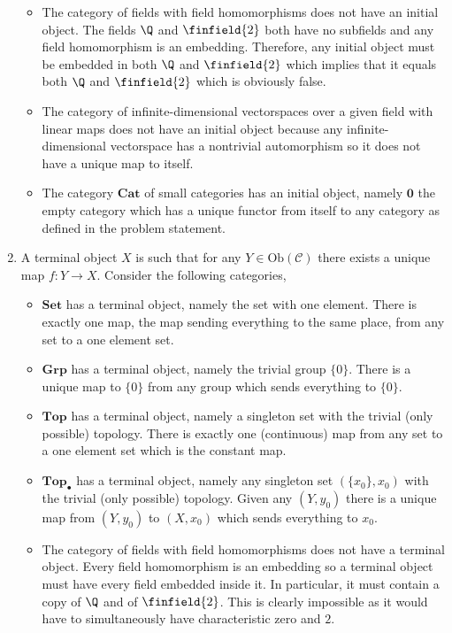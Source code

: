 \documentclass[12pt]{extarticle}
\begin{document}
\begin{enumerate}
\begin{itemize}
\item The category of fields with field homomorphisms does not have an initial object. The fields $\Q$ and $\finfield{2}$ both have no subfields and any field homomorphism is an embedding. Therefore, any initial object must be embedded in both $\Q$ and $\finfield{2}$ which implies that it equals both $\Q$ and $\finfield{2}$ which is obviously false. 

\item The category of infinite-dimensional vectorspaces over a given field with linear maps does not have an initial object because any infinite-dimensional vectorspace has a nontrivial automorphism so it does not have a unique map to itself. 

\item The category $\mathbf{Cat}$ of small categories has an initial object, namely $\mathbf{0}$ the empty category which has a unique functor from itself to any category as defined in the problem statement.   

\end{itemize}

\item A terminal object $X$ is such that for any $Y \in \mathrm{Ob}(\mathcal{C})$ there exists a unique map $f : Y \to X$. Consider the following categories,

\begin{itemize}
\item $\mathbf{Set}$ has a terminal object, namely the set with one element. There is exactly one map, the map sending everything to the same place, from any set to a one element set.  

\item $\mathbf{Grp}$ has a terminal object, namely the trivial group $\{0\}$. There is a unique map to $\{0\}$ from any group which sends everything to $\{0\}$.

\item $\mathbf{Top}$ has a terminal object, namely a singleton set with the trivial (only possible) topology. There is exactly one (continuous) map from any set to a one element set which is the constant map.  

\item $\mathbf{Top}_\bullet$ has a terminal object, namely any singleton set $(\{x_0\}, x_0)$ with the trivial (only possible) topology. Given any $(Y, y_0)$ there is a unique map from $(Y, y_0)$ to $(X, x_0)$ which sends everything to $x_0$.

\item The category of fields with field homomorphisms does not have a terminal object. Every field homomorphism is an embedding so a terminal object must have every field embedded inside it. In particular, it must contain a copy of $\Q$ and of $\finfield{2}$. This is clearly impossible as it would have to simultaneously have characteristic zero and $2$. 


\end{itemize}
\end{enumerate}
\end{document}
